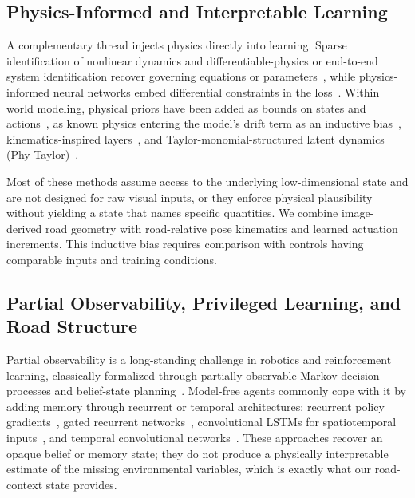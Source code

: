 \documentclass[preprint,12pt]{elsarticle}
\begin{document}
\subsection{Physics-Informed and Interpretable Learning}\label{sec:rw_phys}

A complementary thread injects physics directly into learning.
Sparse identification of nonlinear dynamics and differentiable-physics or
end-to-end system identification recover governing equations or
parameters~\cite{BRUNTON2016710, de2018end, yao2024marrying}, while
physics-informed neural networks embed differential constraints in the
loss~\cite{cai2021physics, ZHONG2023115664}.
Within world modeling, physical priors have been added as bounds on states and
actions~\cite{tumu2023physics, sridhar2023guaranteed}, as known physics entering
the model's drift term as an inductive bias~\cite{djeumou2023learn},
kinematics-inspired layers~\cite{cui2020deep}, and
Taylor-monomial-structured latent dynamics (Phy-Taylor)~\cite{mao_phy-taylor_2025}.

Most of these methods assume access to the underlying low-dimensional state and
are not designed for raw visual inputs, or they enforce physical plausibility
without yielding a state that names specific quantities.
We combine image-derived road geometry with road-relative pose kinematics and
learned actuation increments. This inductive bias requires comparison with
controls having comparable inputs and training conditions.

\subsection{Partial Observability, Privileged Learning, and Road Structure}\label{sec:rw_po}

Partial observability is a long-standing challenge in robotics and reinforcement
learning, classically formalized through partially observable Markov decision
processes and belief-state planning~\cite{kaelbling1998planning,
kaelbling1996reinforcement}.
Model-free agents commonly cope with it by adding memory through recurrent or
temporal architectures: recurrent policy gradients~\cite{wierstra2007solving},
gated recurrent networks~\cite{chung2014empirical}, convolutional LSTMs for
spatiotemporal inputs~\cite{shi2015convolutional}, and temporal convolutional
networks~\cite{bai2018empirical}.
These approaches recover an opaque belief or memory state; they do not produce a
physically interpretable estimate of the missing environmental variables, which is
exactly what our road-context state provides.
\end{document}
